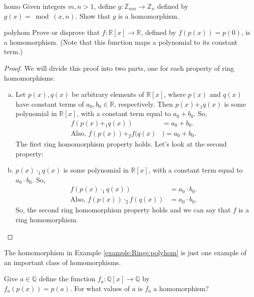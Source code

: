 \begin{exercise}{homo}
Given integers $m,n>1$, define $g:{\mathbb Z}_{mn}\rightarrow {\mathbb Z}_n$ defined by $g(x)=\bmod(x,n)$.  Show that $g$ is a homomorphism.
\end{exercise}

\begin{example}{polyhom}
Prove or disprove that $f:{\mathbb R}[x]\rightarrow{\mathbb R}$, defined by $f(p(x))=p(0)$, is a homomorphism.  (Note that this function maps a polynomial to its constant term.)

\begin{proof}
We will divide this proof into two parts, one for each property of ring homomorphisms:
\begin{enumerate}[(a)]
\item Let $p(x),q(x)$ be arbitrary elements of ${\mathbb R}[x]$, where $p(x)$ and $q(x)$ have constant terms of $a_0,b_0\in {\mathbb R}$, respectively.  Then $p(x)+_1q(x)$ is some polynomial in ${\mathbb R}[x]$, with a constant term equal to $a_0+b_0$.  So,
\begin{align*}
f(p(x)+_1q(x))&=a_0+b_0.\\
\text{Also, } f(p(x))+_2f(q(x)&)=a_0+b_0.
\end{align*}
The first ring homomorphism property holds.  Let's look at the second property:
\item  $p(x)\cdot_1q(x)$ is some polynomial in ${\mathbb R}[x]$, with a constant term equal to $a_0\cdot b_0$.  So,
\begin{align*}
f(p(x)\cdot_1q(x))&=a_0\cdot b_0.\\
\text{Also, }f(p(x))\cdot_2f(q(x))&=a_0\cdot b_0.
\end{align*}
So, the second ring homomorphism property holds and we can say that $f$ is a ring homomorphism.
\end{enumerate}
\end{proof}
\end{example}
The homomorphism in Example \ref{example:Rings:polyhom} is just one example of an important class of homomorphisms.  

\begin{exercise}{}
Give $a\in{\mathbb Q}$ define the function $f_a:  {\mathbb Q}[x]\rightarrow{\mathbb Q}$ by\\ $f_a(p(x))=p(a)$.  For what values of $a$ is $f_a$ a homomorphism?
\end{exercise}

